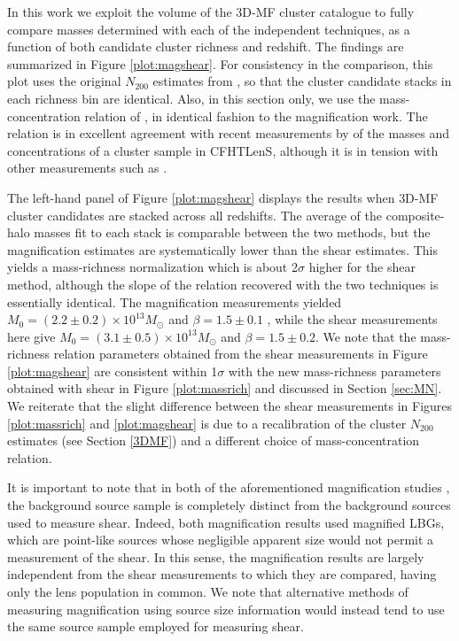 In this work we exploit the volume of the \ac{3D-MF} cluster catalogue to fully compare masses determined with each of the independent techniques, as a function of both candidate cluster richness and redshift. The findings are summarized in Figure \ref{plot:magshear}. For consistency in the comparison, this plot uses the original $N_{200}$ estimates from \citet{Ford14}, so that the cluster candidate stacks in each richness bin are identical. Also, in this section only, we use the mass-concentration relation of \citet{Prada12}, in identical fashion to the magnification work. The \citet{Prada12} relation is in excellent agreement with recent measurements by \citet{Covone14} of the masses and concentrations of a cluster sample in \ac{CFHTLenS}, although it is in tension with other measurements such as \citet{Merten14}. 

The left-hand panel of Figure \ref{plot:magshear} displays the results when \ac{3D-MF} cluster candidates are stacked across all redshifts. The average of the composite-halo masses fit to each stack is comparable between the two methods, but the magnification estimates are systematically lower than the shear estimates. This yields a mass-richness normalization which is about 2$\sigma$ higher for the shear method, although the slope of the relation recovered with the two techniques is essentially identical. The magnification measurements yielded $M_0 = (2.2 \pm 0.2) \times 10^{13} M_{\odot}$ and $\beta = 1.5 \pm 0.1$ \citep[see the miscentred model in][]{Ford14}, while the shear measurements here give $M_0 = (3.1 \pm 0.5) \times 10^{13} M_{\odot}$ and $\beta = 1.5 \pm 0.2$. We note that the mass-richness relation parameters obtained from the shear measurements in Figure \ref{plot:magshear} are consistent within 1$\sigma$ with the new mass-richness parameters obtained with shear in Figure \ref{plot:massrich} and discussed in Section \ref{sec:MN}. We reiterate that the slight difference between the shear measurements in Figures \ref{plot:massrich} and \ref{plot:magshear} is due to a recalibration of the cluster $N_{200}$ estimates (see Section \ref{3DMF}) and a different choice of mass-concentration relation.

It is important to note that in both of the aforementioned magnification studies \citep{Ford12,Ford14}, the background source sample is completely distinct from the background sources used to measure shear. Indeed, both magnification results used magnified \ac{LBG}s, which are point-like sources whose negligible apparent size would not permit a measurement of the shear. In this sense, the magnification results are largely independent from the shear measurements to which they are compared, having only the lens population in common. We note that alternative methods of measuring magnification using source size information would instead tend to use the same source sample employed for measuring shear.

